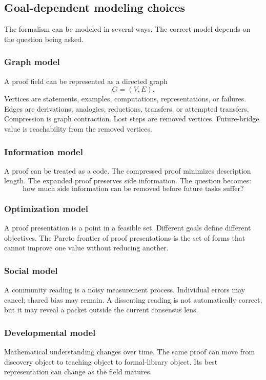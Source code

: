\documentclass[11pt]{article}
\theoremstyle{definition}
\theoremstyle{remark}
\begin{document}
\subsection{Goal-dependent modeling choices}

The formalism can be modeled in several ways.  The correct model depends on the question being asked.

\subsubsection{Graph model}
A proof field can be represented as a directed graph
\[
        G=(V,E).
\]
Vertices are statements, examples, computations, representations, or failures.  Edges are derivations, analogies, reductions, transfers, or attempted transfers.  Compression is graph contraction.  Lost steps are removed vertices.  Future-bridge value is reachability from the removed vertices.

\subsubsection{Information model}
A proof can be treated as a code.  The compressed proof minimizes description length.  The expanded proof preserves side information.  The question becomes:
\[
        \text{how much side information can be removed before future tasks suffer?}
\]

\subsubsection{Optimization model}
A proof presentation is a point in a feasible set.  Different goals define different objectives.  The Pareto frontier of proof presentations is the set of forms that cannot improve one value without reducing another.

\subsubsection{Social model}
A community reading is a noisy measurement process.  Individual errors may cancel; shared bias may remain.  A dissenting reading is not automatically correct, but it may reveal a packet outside the current consensus lens.

\subsubsection{Developmental model}
Mathematical understanding changes over time.  The same proof can move from discovery object to teaching object to formal-library object.  Its best representation can change as the field matures.
\end{document}
